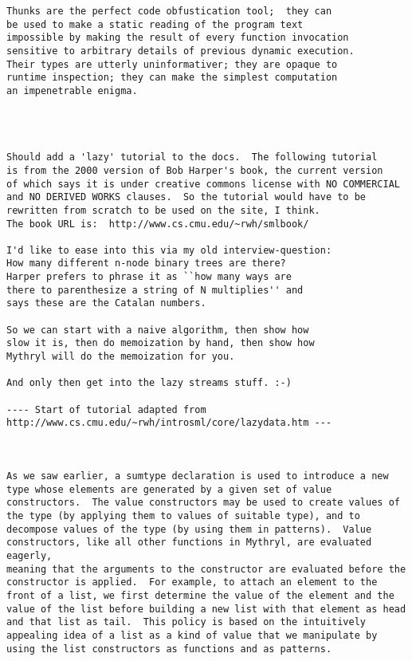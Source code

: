 \begin{verbatim}
Thunks are the perfect code obfustication tool;  they can 
be used to make a static reading of the program text 
impossible by making the result of every function invocation 
sensitive to arbitrary details of previous dynamic execution. 
Their types are utterly uninformativer; they are opaque to 
runtime inspection; they can make the simplest computation 
an impenetrable enigma. 




Should add a 'lazy' tutorial to the docs.  The following tutorial 
is from the 2000 version of Bob Harper's book, the current version 
of which says it is under creative commons license with NO COMMERCIAL 
and NO DERIVED WORKS clauses.  So the tutorial would have to be 
rewritten from scratch to be used on the site, I think. 
The book URL is:  http://www.cs.cmu.edu/~rwh/smlbook/ 

I'd like to ease into this via my old interview-question: 
How many different n-node binary trees are there? 
Harper prefers to phrase it as ``how many ways are 
there to parenthesize a string of N multiplies'' and 
says these are the Catalan numbers. 

So we can start with a naive algorithm, then show how 
slow it is, then do memoization by hand, then show how 
Mythryl will do the memoization for you. 

And only then get into the lazy streams stuff. :-) 

---- Start of tutorial adapted from http://www.cs.cmu.edu/~rwh/introsml/core/lazydata.htm ---



As we saw earlier, a sumtype declaration is used to introduce a new 
type whose elements are generated by a given set of value 
constructors.  The value constructors may be used to create values of 
the type (by applying them to values of suitable type), and to 
decompose values of the type (by using them in patterns).  Value 
constructors, like all other functions in Mythryl, are evaluated eagerly, 
meaning that the arguments to the constructor are evaluated before the 
constructor is applied.  For example, to attach an element to the 
front of a list, we first determine the value of the element and the 
value of the list before building a new list with that element as head 
and that list as tail.  This policy is based on the intuitively 
appealing idea of a list as a kind of value that we manipulate by 
using the list constructors as functions and as patterns. 
 

\end{verbatim}
